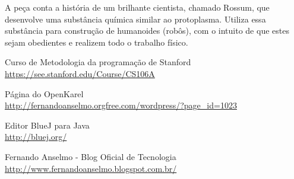 \documentclass[a4paper,11pt]{article}
\begin{document}

\begin{thebibliography}{5}

  A peça conta a história de um brilhante cientista, chamado Rossum, que desenvolve uma substância química similar ao protoplasma. Utiliza essa substância para construção de humanoides (robôs), com o intuito de que estes sejam obedientes e realizem todo o trabalho físico.

  Curso de Metodologia da programação de Stanford \\
  \url{https://see.stanford.edu/Course/CS106A}
  
  Página do OpenKarel \\
  \url{http://fernandoanselmo.orgfree.com/wordpress/?page_id=1023}
  
  Editor BlueJ para Java \\
  \url{http://bluej.org/}

  Fernando Anselmo - Blog Oficial de Tecnologia \\
  \url{http://www.fernandoanselmo.blogspot.com.br/}
  
\end{thebibliography}
  
\end{document}
